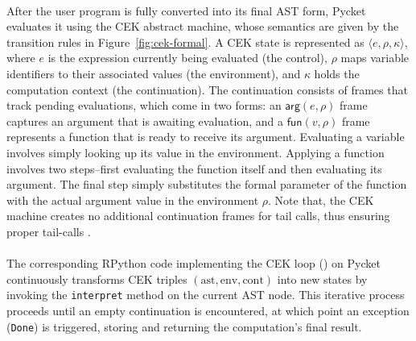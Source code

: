         \paragraph{}%
            After the user program is fully converted into its final AST form, Pycket evaluates it using the CEK abstract machine, whose semantics are given by the transition rules in Figure~\ref{fig:cek-formal}. A CEK state is represented as $\langle e,\rho,\kappa\rangle$, where $e$ is the expression currently being evaluated (the control), $\rho$ maps variable identifiers to their associated values (the environment), and $\kappa$ holds the computation context (the continuation). The continuation consists of frames that track pending evaluations, which come in two forms: an $\mathsf{arg}(e,\rho)$ frame captures an argument that is awaiting evaluation, and a $\mathsf{fun}(v,\rho)$ frame represents a function that is ready to receive its argument. Evaluating a variable involves simply looking up its value in the environment. Applying a function involves two steps--first evaluating the function itself and then evaluating its argument. The final step simply substitutes the formal parameter of the function with the actual argument value in the environment $\rho$. Note that, the CEK machine creates no additional continuation frames for tail calls, thus ensuring proper tail-calls \cite{pycketmain}.

        \paragraph{}%
            The corresponding RPython code implementing the CEK loop () on Pycket continuously transforms CEK triples $(\text{ast}, \text{env}, \text{cont})$ into new states by invoking the \texttt{interpret} method on the current AST node. This iterative process proceeds until an empty continuation is encountered, at which point an exception (\texttt{Done}) is triggered, storing and returning the computation’s final result.



